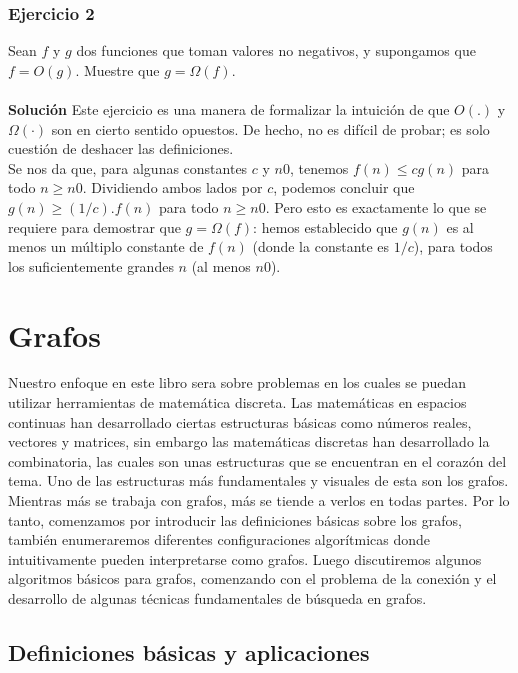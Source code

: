\documentclass[a4paper, 12pt]{book}
\begin{document}
\subsection*{Ejercicio 2} 

Sean $f$ y $g$ dos funciones que toman valores no negativos, y supongamos que $f=O(g)$. Muestre que $g=\Omega(f)$.\\\\
\textbf{Solución} Este ejercicio es una manera de formalizar la intuición de que $O(.)$ y $\Omega(·)$ son en cierto sentido opuestos. De hecho, no es difícil de probar; es solo cuestión de deshacer las definiciones.\\
Se nos da que, para algunas constantes $c$ y $n0$, tenemos $f(n)≤cg(n)$ para todo $n≥n0$. Dividiendo ambos lados por $c$, podemos concluir que $g(n)≥(1/c).f(n)$ para todo $n≥n0$. Pero esto es exactamente lo que se requiere para demostrar que $g=\Omega(f)$: hemos establecido que $g(n)$ es al menos un múltiplo constante de $f(n)$ (donde la constante es $1/c$), para todos los suficientemente grandes $n$ (al menos $n0$).\\

\chapter{Grafos}
\label{ch:grafos}

Nuestro enfoque en este libro sera sobre problemas en los cuales se puedan utilizar herramientas de matemática discreta. Las matemáticas en espacios continuas han desarrollado ciertas estructuras básicas como números reales, vectores y matrices, sin embargo las matemáticas discretas han desarrollado la combinatoria, las cuales son unas estructuras que se encuentran en el corazón del tema. Uno de las estructuras más fundamentales y visuales de esta son los grafos. \\

Mientras más se trabaja con grafos, más se tiende a verlos en todas partes.
Por lo tanto, comenzamos por introducir las definiciones básicas sobre los grafos, también enumeraremos diferentes configuraciones algorítmicas donde intuitivamente pueden interpretarse como grafos. Luego discutiremos algunos algoritmos básicos para grafos, comenzando
con el problema de la conexión y el desarrollo de algunas técnicas fundamentales de búsqueda en grafos.\\

\section{Definiciones básicas y aplicaciones}
\end{document}
